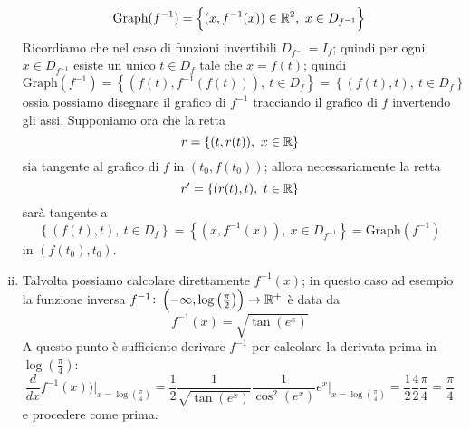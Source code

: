 \begin{example}
\begin{enumerate}[(i)]
        \[
        \text{Graph}(f^{-1}) = \left\{(x, f^{-1}(x))\in\amsbb{R}^2, \ x\in D_{f^{-1}}\right\}
        \]
        Ricordiamo che nel caso di funzioni invertibili $D_{f^{-1}} = I_f$; quindi per ogni $x\in D_{f^{-1}}$ esiste un unico $t\in D_f$ tale che $x=f(t)$; quindi
        \[
        \text{Graph}(f^{-1}) = \left\{(f(t), f^{-1}(f(t))), \ t\in D_f\right\} = \left\{(f(t), t), \ t\in D_f\right\} 
        \]
        ossia possiamo disegnare il grafico di $f^{-1}$ tracciando il grafico di $f$ invertendo gli assi. Supponiamo ora che la retta
        \[
        r = \{(t, r(t)), \ x\in\amsbb{R}\}
        \]
        sia tangente al grafico di $f$ in $(t_0, f(t_0))$; allora necessariamente la retta
        \[
        r'=\{(r(t), t), \ t\in\amsbb{R} \}
        \]
        sarà tangente a
        \[
        \left\{(f(t), t), \ t\in D_f\right\} = \left\{(x, f^{-1}(x)), \ x\in D_{f^{-1}}\right\} = \text{Graph}(f^{-1})
        \]
        in $(f(t_0), t_0)$.
        \item Talvolta possiamo calcolare direttamente $f^{-1}(x)$; in questo caso ad esempio la funzione inversa $f^{-1}\colon \left(-\infty, \log\left(\frac{\pi}{2}\right)\right)\to\amsbb{R}^+$ è data da
        \[
        f^{-1}(x) = \sqrt{\tan(e^{x})}
        \]
        A questo punto è sufficiente derivare $f^{-1}$ per calcolare la derivata prima in $\log\left(\frac{\pi}{4}\right)$:
        \[
        \frac{d}{dx}f^{-1}(x))\bigg|_{x=\log\left(\frac{\pi}{4}\right)} = \frac{1}{2}\frac{1}{\sqrt{\tan(e^x)}}\frac{1}{\cos^2(e^x)}e^x\bigg|_{x=\log\left(\frac{\pi}{4}\right)} = \frac{1}{2}\frac{4}{2}\frac{\pi}{4} = \frac{\pi}{4}
        \]
        e procedere come prima.
    \end{enumerate}
\end{example}
